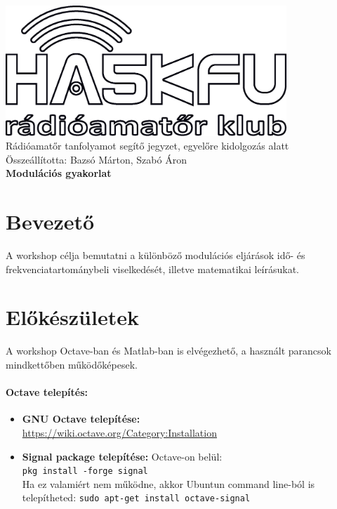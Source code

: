 \documentclass[12pt,a4paper]{article}
\begin{document}
\begin{center}
\includegraphics[width=300pt,keepaspectratio]{figures/ha5kfu.eps}
\\[0.5cm]
Rádióamatőr tanfolyamot segítő jegyzet, egyelőre kidolgozás alatt \\
Összeállította: Bazsó Márton, Szabó Áron %
\\[1cm]

{\huge \bfseries Modulációs gyakorlat \\[2cm]}



\end{center}

\renewcommand{\contentsname}{Tartalom}\tableofcontents 
\newpage

\newpage

\section{Bevezető}
A workshop célja bemutatni a különböző modulációs eljárások idő- és frekvenciatartománybeli viselkedését, illetve matematikai leírásukat. 

\section{Előkészületek}
A workshop Octave-ban és Matlab-ban is elvégezhető, a használt parancsok mindkettőben működőképesek.

\paragraph{Octave telepítés:} 
\begin{itemize}
	\item \textbf{GNU Octave telepítése:} \\\url{https://wiki.octave.org/Category:Installation}
	\item \textbf{Signal package telepítése:} Octave-on belül: 	\\
	\texttt{pkg install -forge signal}\\
	Ha ez valamiért nem működne, akkor Ubuntun command line-ból is telepítheted: \texttt{sudo apt-get install octave-signal}
\end{itemize}
\end{document}
